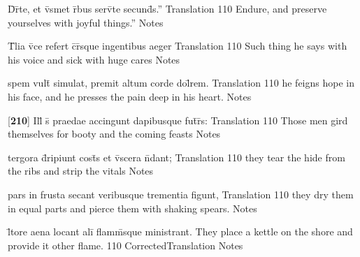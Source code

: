 \latline
  {D\={}r\={}te, et v\={}smet r\={}bus serv\={}te secund\={\macron {\i}}s.''}
  { Translation }
  {110}
  { Endure, and preserve yourselves with joyful things.'' }
  { Notes }


\latline
  {T\={}lia v\={}ce refert c\={}r\={\macron {\i}}sque ingentibus aeger}
  { Translation }
  {110}
  { Such thing he says with his voice and sick with huge cares  }
  { Notes }


\latline
  {spem vult\={} simulat, premit altum corde dol\={}rem.}
  { Translation }
  {110}
  { he feigns hope in his face, and he presses the pain deep in his heart. }
  { Notes }


\latline
  {[\textbf{210}] Ill\={\macron {\i}} s\={} praedae accingunt dapibusque fut\={}r\={\macron {\i}}s:}
  { Translation }
  {110}
  { Those men gird themselves for booty and the coming feasts }
  { Notes }


\latline
  {tergora d\={\macron {\i}}ripiunt cost\={\macron {\i}}s et v\={\macron {\i}}scera n\={}dant;}
  { Translation }
  {110}
  { they tear the hide from the ribs and strip the vitals }
  { Notes }


\latline
  {pars in frusta secant veribusque trementia figunt,}
  { Translation }
  {110}
  { they dry them in equal parts and pierce them with shaking spears. }
  { Notes }


\latline
  {l\={\macron {\i}}tore aena locant ali\={\macron {\i}} flamm\={}sque ministrant.}
  { They place a kettle on the shore and provide it other flame. }
  {110}
  { CorrectedTranslation }
  { Notes }

